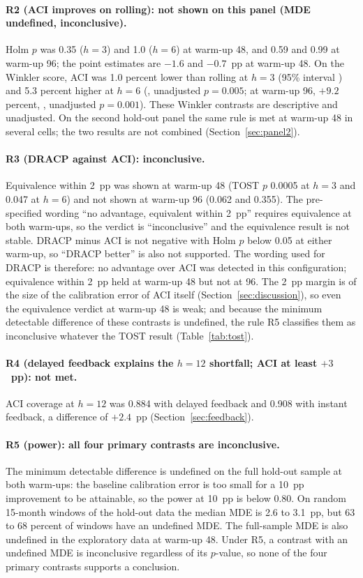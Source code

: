 \paragraph{R2 (ACI improves on rolling): not shown on this panel (MDE undefined, inconclusive).} Holm $p$ was 0.35 ($h=3$) and 1.0 ($h=6$) at warm-up 48, and 0.59 and 0.99 at warm-up 96; the point estimates are $-1.6$ and $-0.7$~pp at warm-up 48. On the Winkler score, ACI was 1.0 percent lower than rolling at $h=3$ (95\% interval ) and 5.3 percent higher at $h=6$ (, unadjusted $p=0.005$; at warm-up 96, $+9.2$ percent, , unadjusted $p=0.001$). These Winkler contrasts are descriptive and unadjusted. On the second hold-out panel the same rule is met at warm-up 48 in several cells; the two results are not combined (Section~\ref{sec:panel2}).

\paragraph{R3 (DRACP against ACI): inconclusive.} Equivalence within 2~pp was shown at warm-up 48 (TOST $p$ 0.0005 at $h=3$ and 0.047 at $h=6$) and not shown at warm-up 96 (0.062 and 0.355). The pre-specified wording ``no advantage, equivalent within 2~pp'' requires equivalence at both warm-ups, so the verdict is ``inconclusive'' and the equivalence result is not stable. DRACP minus ACI is not negative with Holm $p$ below 0.05 at either warm-up, so ``DRACP better'' is also not supported. The wording used for DRACP is therefore: no advantage over ACI was detected in this configuration; equivalence within 2~pp held at warm-up 48 but not at 96. The 2~pp margin is of the size of the calibration error of ACI itself (Section~\ref{sec:discussion}), so even the equivalence verdict at warm-up 48 is weak; and because the minimum detectable difference of these contrasts is undefined, the rule R5 classifies them as inconclusive whatever the TOST result (Table~\ref{tab:tost}).

\paragraph{R4 (delayed feedback explains the $h=12$ shortfall; ACI at least $+3$~pp): not met.} ACI coverage at $h=12$ was 0.884 with delayed feedback and 0.908 with instant feedback, a difference of $+2.4$~pp (Section~\ref{sec:feedback}).

\paragraph{R5 (power): all four primary contrasts are inconclusive.} The minimum detectable difference is undefined on the full hold-out sample at both warm-ups: the baseline calibration error is too small for a 10~pp improvement to be attainable, so the power at 10~pp is below 0.80. On random 15-month windows of the hold-out data the median MDE is 2.6 to 3.1~pp, but 63 to 68 percent of windows have an undefined MDE. The full-sample MDE is also undefined in the exploratory data at warm-up 48. Under R5, a contrast with an undefined MDE is inconclusive regardless of its $p$-value, so none of the four primary contrasts supports a conclusion.

